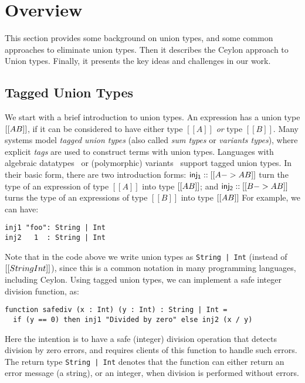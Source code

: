 \section{Overview}
\label{sec:overview}

This section provides some background on union types, and some common approaches
to eliminate union types. Then it describes the Ceylon approach to Union types.
Finally, it presents the key ideas and challenges in our work.

\subsection{Tagged Union Types}


We start with a brief introduction to union types. An expression has a union
type $[[A\/B]]$, if it can be considered to have either type $[[A]]$ \textit{or}
type $[[B]]$. Many systems model \textit{tagged union types} (also called
\textit{sum types} or \textit{variants types}), where explicit \textit{tags}
are used to construct terms with union types. Languages with algebraic datatypes~\cite{hope}
or (polymorphic) variants~\cite{garrigue98} support tagged union types.
In their basic form, there are two introduction forms:
$\mathsf{inj_1} :: [[A -> A \/ B]]$ turn the type of an expression of type
$[[A]]$ into type $[[A \/ B]]$; and $\mathsf{inj_2} :: [[B -> A \/ B]]$
turns the type of an expressions of type $[[B]]$ into type $[[A \/ B]]$
For example, we can have:

\begin{lstlisting}
inj1 "foo": String | Int
inj2   1  : String | Int
\end{lstlisting}

\noindent Note that in the code above we write union types as
\lstinline{String | Int} (instead of $[[String \/ Int]]$),
since this is a common notation in many programming languages,
including Ceylon.
Using tagged union types, we can implement a safe integer
division function, as:

\begin{lstlisting}
function safediv (x : Int) (y : Int) : String | Int =
  if (y == 0) then inj1 "Divided by zero" else inj2 (x / y)
\end{lstlisting}

\noindent Here the intention is to have a safe (integer) division operation that detects
division by zero errors, and requires clients of this function to handle
such errors. The return type \lstinline{String | Int} denotes that the function
can either return an error message (a string), or an integer, when division
is performed without errors.

